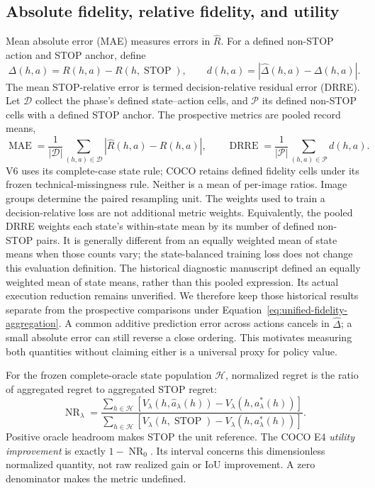 

\subsection{Absolute fidelity, relative fidelity, and utility}
Mean absolute error (MAE) measures errors in $\widehat R$. For a defined non-STOP action
and STOP anchor, define
\begin{equation}
 \Delta(h,a)=R(h,a)-R(h,\operatorname{STOP}),\qquad
 d(h,a)=|\widehat\Delta(h,a)-\Delta(h,a)|.
 \label{eq:unified-drre}
\end{equation}
The mean STOP-relative error is termed decision-relative residual error
(DRRE). Let $\mathcal D$ collect the phase's defined state--action cells, and
$\mathcal P$ its defined non-STOP cells with a defined STOP anchor. The
prospective metrics are pooled record means,
\begin{equation}
 \operatorname{MAE}=\frac{1}{|\mathcal D|}
     \sum_{(h,a)\in\mathcal D}|\widehat R(h,a)-R(h,a)|,\qquad
 \operatorname{DRRE}=\frac{1}{|\mathcal P|}
     \sum_{(h,a)\in\mathcal P}d(h,a).
 \label{eq:unified-fidelity-aggregation}
\end{equation}
V6 uses its complete-case state rule; COCO retains defined fidelity cells
under its frozen technical-missingness rule. Neither is a mean of per-image
ratios. Image groups determine the paired resampling unit. The weights used
to train a decision-relative loss are not additional metric weights.
Equivalently, the pooled DRRE weights each state's within-state mean by
its number of defined non-STOP pairs. It is generally different from an
equally weighted mean of state means when those counts vary; the
state-balanced training loss does not change this evaluation definition.
The historical diagnostic manuscript defined an equally weighted mean of
state means, rather than this pooled expression. Its actual execution
reduction remains unverified. We therefore keep those historical results
separate from the prospective comparisons under Equation~\ref{eq:unified-fidelity-aggregation}.
A common additive prediction error
across actions cancels in $\widehat\Delta$; a small absolute error can still
reverse a close ordering. This motivates measuring both quantities without
claiming either is a universal proxy for policy value.

For the frozen complete-oracle state population $\mathcal H$, normalized
regret is the ratio of aggregated regret to aggregated STOP regret:
\begin{equation}
 \operatorname{NR}_\lambda=
 \frac{\sum_{h\in\mathcal H}[V_\lambda(h,\widehat a_\lambda(h))-
                   V_\lambda(h,a^*_\lambda(h))]}
      {\sum_{h\in\mathcal H}[V_\lambda(h,\operatorname{STOP})-
                   V_\lambda(h,a^*_\lambda(h))]}.
 \label{eq:unified-normalized-regret}
\end{equation}
Positive oracle headroom makes STOP the unit reference. The COCO E4
\emph{utility improvement} is exactly $1-\operatorname{NR}_0$. Its interval
concerns this dimensionless normalized quantity, not raw realized gain or
IoU improvement. A zero denominator makes the metric undefined.

